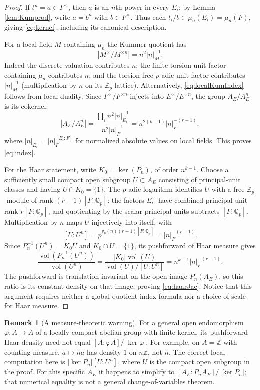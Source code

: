 \documentclass[11pt]{article}
\newcommand{\Z}{\mathbb Z}
\theoremstyle{plain}
\theoremstyle{definition}
\newtheorem{remark}[theorem]{Remark}
\begin{document}
\begin{proof}
If $t^n=a\in F^\times$, then $a$ is an $n$th power in every
$E_i$; by Lemma \ref{lem:Kumprod}, write $a=b^n$ with $b\in F^\times$.
Thus each $t_i/b\in\mu_n(E_i)=\mu_n(F)$, giving
\eqref{eq:kernel}, including its canonical description.

For a local field $M$ containing $\mu_n$ the Kummer quotient has
\begin{equation}\label{eq:localKumIndex}
 |M^\times/M^{\times n}|=n^2|n|_M^{-1}.
\end{equation}
Indeed the discrete valuation contributes $n$; the finite
torsion unit factor containing $\mu_n$ contributes $n$; and
the torsion-free $p$-adic unit factor contributes
$|n|_M^{-1}$ (multiplication by $n$ on its $\Z_p$-lattice).  Alternatively, \eqref{eq:localKumIndex}
follows from local duality.
Since $F^\times/F^{\times n}$ injects into
$E^\times/E^{\times n}$, the group $A_E/A_E^n$ is its cokernel:
\[
 |A_E/A_E^n|
 =\frac{\prod_i n^2|n|_{E_i}^{-1}}
             {n^2|n|_F^{-1}}
 =n^{2(k-1)}|n|_F^{-(r-1)},
\]
where $|n|_{E_i}=|n|_F^{[E_i:F]}$ for normalized absolute values
on local fields.  This proves \eqref{eq:index}.

For the Haar statement, write $K_0=\ker(P_n)$, of order
$n^{k-1}$.  Choose a sufficiently small compact open subgroup
$U\subset A_E$ consisting of principal-unit classes and having
$U\cap K_0=\{1\}$.  The $p$-adic logarithm identifies $U$ with
a free $\mathbb Z_p$-module of rank
$(r-1)[F:\mathbb Q_p]$: the factors $E_i^\times$ have combined
principal-unit rank $r[F:\mathbb Q_p]$, and quotienting by the
scalar principal units subtracts $[F:\mathbb Q_p]$.
Multiplication by $n$ maps $U$ injectively into itself, with
\[
 [U:U^n]=p^{v_p(n)(r-1)[F:\mathbb Q_p]}
        =|n|_F^{-(r-1)}.
\]
Since $P_n^{-1}(U^n)=K_0U$ and $K_0\cap U=\{1\}$, its
pushforward of Haar measure gives
\[
 \frac{\operatorname{vol}(P_n^{-1}(U^n))}
      {\operatorname{vol}(U^n)}
   =\frac{|K_0|\operatorname{vol}(U)}
          {\operatorname{vol}(U)/[U:U^n]}
   =n^{k-1}|n|_F^{-(r-1)}.
\]
The pushforward is translation-invariant on the open image
$P_n(A_E)$, so this ratio is its constant density on that image,
proving \eqref{eq:haarJac}.  Notice that this argument requires
neither a global quotient-index formula nor a choice of scale for
Haar measure.
\end{proof}

\begin{remark}[A measure-theoretic warning]\label{rem:haar}
For a general open endomorphism $\varphi:A\to A$ of a locally
compact abelian group with finite kernel, its pushforward Haar density
need not equal $[A:\varphi A]/|\ker\varphi|$.  For example, on
$A=\mathbb Z$ with counting measure, $a\mapsto na$ has density
$1$ on $n\mathbb Z$, not $n$.  The correct local computation here is
$|\ker P_n|[U:U^n]$, where $U$ is the compact open subgroup in
the proof.  For this specific $A_E$ it happens to simplify to
$[A_E:P_nA_E]/|\ker P_n|$; that numerical equality is not a
general change-of-variables theorem.
\end{remark}
\end{document}
